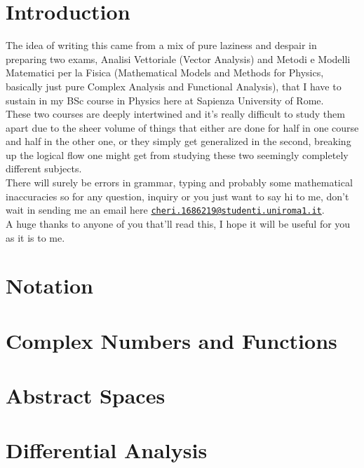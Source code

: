 \documentclass{book}
\theoremstyle{definition}
\theoremstyle{remark}
\newcommand{\1}{\ensuremath{\mathds{1}}}
\begin{document}

\tableofcontents
\chapter*{Introduction}
The idea of writing this came from a mix of pure laziness and despair in preparing two exams, Analisi Vettoriale (Vector Analysis) and Metodi e Modelli Matematici per la Fisica (Mathematical Models and Methods for Physics, basically just pure Complex Analysis and Functional Analysis), that I have to sustain in my BSc course in Physics here at Sapienza University of Rome.\\
These two courses are deeply intertwined and it's really difficult to study them apart due to the sheer volume of things that either are done for half in one course and half in the other one, or they simply get generalized in the second, breaking up the logical flow one might get from studying these two seemingly completely different subjects.\\
There will surely be errors in grammar, typing and probably some mathematical inaccuracies so for any question, inquiry or you just want to say hi to me, don't wait in sending me an email here \href{mailto:cheri.1686219@studenti.uniroma1.it}{\texttt{cheri.1686219@studenti.uniroma1.it}}.\\
A huge thanks to anyone of you that'll read this, I hope it will be useful for you as it is to me.
\chapter*{Notation}

\chapter{Complex Numbers and Functions}

\chapter{Abstract Spaces}

%
%
\chapter{Differential Analysis}

\end{document}
